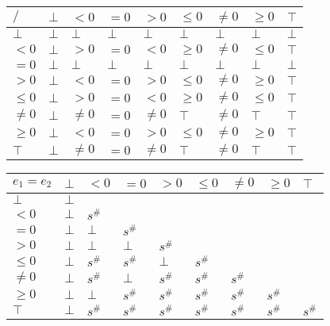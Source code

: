 \documentclass{article}
\begin{document}
        \begin{table}[]
            \begin{tabular}{|l|l|l|l|l|l|l|l|l|}
            \hline
            $/$     & $\bot$ & $<0$    & $=0$   & $>0$    & $\le 0$ & $\ne 0$ & $\ge 0$ & $\top$ \\ \hline
            $\bot$  & $\bot$ & $\bot$  & $\bot$ & $\bot$  & $\bot$  & $\bot$  & $\bot$  & $\bot$ \\ \hline
            $<0$    & $\bot$ & $>0$    & $=0$   & $<0$    & $\ge 0$ & $\ne 0$ & $\le 0$ & $\top$ \\ \hline
            $=0$    & $\bot$ & $\bot$  & $\bot$ & $\bot$  & $\bot$  & $\bot$  & $\bot$  & $\bot$ \\ \hline
            $>0$    & $\bot$ & $<0$    & $=0$   & $>0$    & $\le 0$ & $\ne 0$ & $\ge 0$ & $\top$ \\ \hline
            $\le 0$ & $\bot$ & $>0$    & $=0$   & $<0$    & $\ge 0$ & $\ne 0$ & $\le 0$ & $\top$ \\ \hline
            $\ne 0$ & $\bot$ & $\ne 0$ & $=0$   & $\ne 0$ & $\top$  & $\ne 0$ & $\top$  & $\top$ \\ \hline
            $\ge 0$ & $\bot$ & $<0$    & $=0$   & $>0$    & $\le 0$ & $\ne 0$ & $\ge 0$ & $\top$ \\ \hline
            $\top$  & $\bot$ & $\ne 0$ & $=0$   & $\ne 0$ & $\top$  & $\ne 0$ & $\top$  & $\top$ \\ \hline
            \end{tabular}
            \end{table}



\begin{table}
    \begin{tabular}{|l|l|l|l|l|l|l|l|l|}
    \hline
    $e_1 = e_2$ & $\bot$ & $<0$   & $=0$   & $>0$   & $\le 0$ & $\ne 0$ & $\ge 0$ & $\top$ \\ \hline
    $\bot$      & $\bot$ &        &        &        &         &         &         &        \\ \hline
    $<0$        & $\bot$ & $s^\#$ &        &        &         &         &         &        \\ \hline
    $=0$        & $\bot$ & $\bot$ & $s^\#$ &        &         &         &         &        \\ \hline
    $>0$        & $\bot$ & $\bot$ & $\bot$ & $s^\#$ &         &         &         &        \\ \hline
    $\le 0$     & $\bot$ & $s^\#$ & $s^\#$ & $\bot$ & $s^\#$  &         &         &        \\ \hline
    $\ne 0$     & $\bot$ & $s^\#$ & $\bot$ & $s^\#$ & $s^\#$  & $s^\#$  &         &        \\ \hline
    $\ge 0$     & $\bot$ & $\bot$ & $s^\#$ & $s^\#$ & $s^\#$  & $s^\#$  & $s^\#$  &        \\ \hline
    $\top$      & $\bot$ & $s^\#$ & $s^\#$ & $s^\#$ & $s^\#$  & $s^\#$  & $s^\#$  & $s^\#$ \\ \hline
    \end{tabular}
    \end{table}
\end{document}
